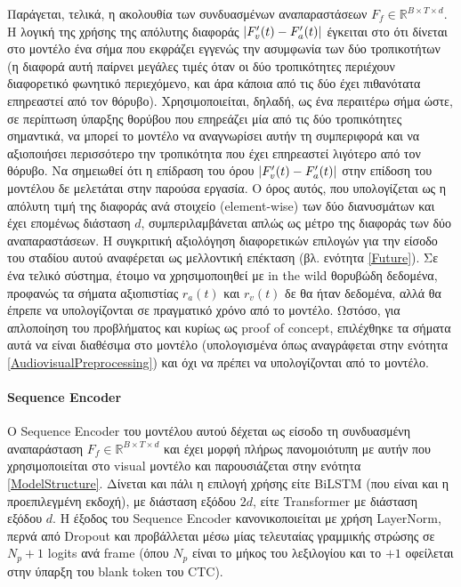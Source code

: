 Παράγεται, τελικά, η ακολουθία των συνδυασμένων αναπαραστάσεων $F_f \in \mathbb{R}^{B \times T \times d}$. Η λογική της χρήσης της απόλυτης διαφοράς $\lvert F_v\sp{\prime}(t) - F_a\sp{\prime}(t) \rvert$ έγκειται στο ότι δίνεται στο μοντέλο ένα σήμα που εκφράζει εγγενώς την ασυμφωνία των δύο τροπικοτήτων (η διαφορά αυτή παίρνει μεγάλες τιμές όταν οι δύο τροπικότητες περιέχουν διαφορετικό φωνητικό περιεχόμενο, και άρα κάποια από τις δύο έχει πιθανότατα επηρεαστεί από τον θόρυβο). Χρησιμοποιείται, δηλαδή, ως ένα περαιτέρω σήμα ώστε, σε περίπτωση ύπαρξης θορύβου που επηρεάζει μία από τις δύο τροπικότητες σημαντικά, να μπορεί το μοντέλο να αναγνωρίσει αυτήν τη συμπεριφορά και να αξιοποιήσει περισσότερο την τροπικότητα που έχει επηρεαστεί λιγότερο από τον θόρυβο. Να σημειωθεί ότι η επίδραση του όρου $\lvert F_v\sp{\prime}(t) - F_a\sp{\prime}(t) \rvert$ στην επίδοση του μοντέλου δε μελετάται στην παρούσα εργασία. Ο όρος αυτός, που υπολογίζεται ως η απόλυτη τιμή της διαφοράς ανά στοιχείο (element-wise) των δύο διανυσμάτων και έχει επομένως διάσταση $d$, συμπεριλαμβάνεται απλώς ως μέτρο της διαφοράς των δύο αναπαραστάσεων. Η συγκριτική αξιολόγηση διαφορετικών επιλογών για την είσοδο του σταδίου αυτού αναφέρεται ως μελλοντική επέκταση (βλ. ενότητα \ref{Future}). Σε ένα τελικό σύστημα, έτοιμο να χρησιμοποιηθεί με in the wild θορυβώδη δεδομένα, προφανώς τα σήματα αξιοπιστίας $r_a(t)$ και $r_v(t)$ δε θα ήταν δεδομένα, αλλά θα έπρεπε να υπολογίζονται σε πραγματικό χρόνο από το μοντέλο. Ωστόσο, για απλοποίηση του προβλήματος και κυρίως ως proof of concept, επιλέχθηκε τα σήματα αυτά να είναι διαθέσιμα στο μοντέλο (υπολογισμένα όπως αναγράφεται στην ενότητα \ref{AudiovisualPreprocessing}) και όχι να πρέπει να υπολογίζονται από το μοντέλο.

\paragraph{Sequence Encoder}
Ο Sequence Encoder του μοντέλου αυτού δέχεται ως είσοδο τη συνδυασμένη αναπαράσταση $F_f \in \mathbb{R}^{B \times T \times d}$ και έχει μορφή πλήρως πανομοιότυπη με αυτήν που χρησιμοποιείται στο visual μοντέλο και παρουσιάζεται στην ενότητα \ref{ModelStructure}. Δίνεται και πάλι η επιλογή χρήσης είτε BiLSTM (που είναι και η προεπιλεγμένη εκδοχή), με διάσταση εξόδου $2d$, είτε Transformer με διάσταση εξόδου $d$. Η έξοδος του Sequence Encoder κανονικοποιείται με χρήση LayerNorm, περνά από Dropout και προβάλλεται μέσω μίας τελευταίας γραμμικής στρώσης σε $N_p+1$ logits ανά frame (όπου $N_p$ είναι το μήκος του λεξιλογίου και το $+1$ οφείλεται στην ύπαρξη του blank token του CTC).

